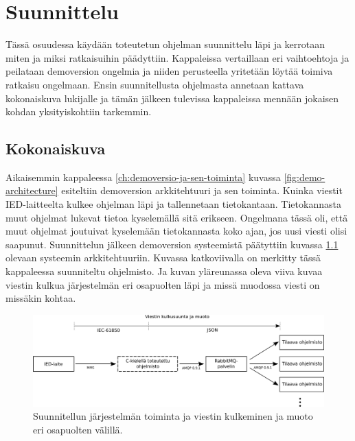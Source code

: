 \chapter{Suunnittelu}
\label{ch:suunnittelu}
Tässä osuudessa käydään toteutetun ohjelman suunnittelu läpi ja kerrotaan miten ja miksi ratkaisuihin päädyttiin. Kappaleissa vertaillaan eri vaihtoehtoja ja peilataan demoversion ongelmia ja niiden perusteella yritetään löytää toimiva ratkaisu ongelmaan. Ensin suunnitellusta ohjelmasta annetaan kattava kokonaiskuva lukijalle ja tämän jälkeen tulevissa kappaleissa mennään jokaisen kohdan yksityiskohtiin tarkemmin.


\section{Kokonaiskuva}
Aikaisemmin kappaleessa \ref{ch:demoversio-ja-sen-toiminta} kuvassa \ref{fig:demo-architecture} esiteltiin demoversion arkkitehtuuri ja sen toiminta. Kuinka viestit IED-laitteelta kulkee ohjelman läpi ja tallennetaan tietokantaan. Tietokannasta muut ohjelmat lukevat tietoa kyselemällä sitä erikseen. Ongelmana tässä oli, että muut ohjelmat joutuivat kyselemään tietokannasta koko ajan, jos uusi viesti olisi saapunut. Suunnittelun jälkeen demoversion systeemistä päätyttiin kuvassa \ref{fig:planned-system-architecture} olevaan systeemin arkkitehtuuriin. Kuvassa katkoviivalla on merkitty tässä kappaleessa suunniteltu ohjelmisto. Ja kuvan yläreunassa oleva viiva kuvaa viestin kulkua järjestelmän eri osapuolten läpi ja missä muodossa viesti on missäkin kohtaa.

\begin{figure}
	\includegraphics[width=1\textwidth]{pictures/planned-system-architecture.png}
	\caption{Suunnitellun järjestelmän toiminta ja viestin kulkeminen ja muoto eri osapuolten välillä.}
	\label{fig:planned-system-architecture}
\end{figure}

